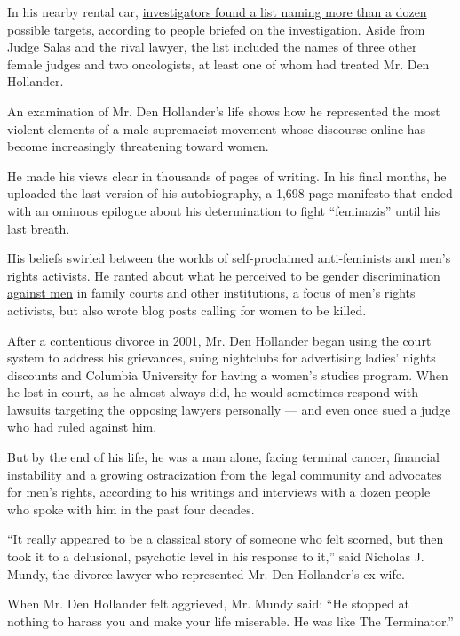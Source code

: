 In his nearby rental car,
\href{https://www.nytimes3xbfgragh.onion/2020/07/25/nyregion/roy-den-hollander-esther-salas-list.html}{investigators
found a list naming more than a dozen possible targets}, according to
people briefed on the investigation. Aside from Judge Salas and the
rival lawyer, the list included the names of three other female judges
and two oncologists, at least one of whom had treated Mr. Den Hollander.

An examination of Mr. Den Hollander's life shows how he represented the
most violent elements of a male supremacist movement whose discourse
online has become increasingly threatening toward women.

He made his views clear in thousands of pages of writing. In his final
months, he uploaded the last version of his autobiography, a 1,698-page
manifesto that ended with an ominous epilogue about his determination to
fight ``feminazis'' until his last breath.

His beliefs swirled between the worlds of self-proclaimed anti-feminists
and men's rights activists. He ranted about what he perceived to be
\href{https://www.nytimes3xbfgragh.onion/2018/07/13/style/mens-rights-movement.html}{gender
discrimination against men} in family courts and other institutions, a
focus of men's rights activists, but also wrote blog posts calling for
women to be killed.

After a contentious divorce in 2001, Mr. Den Hollander began using the
court system to address his grievances, suing nightclubs for advertising
ladies' nights discounts and Columbia University for having a women's
studies program. When he lost in court, as he almost always did, he
would sometimes respond with lawsuits targeting the opposing lawyers
personally --- and even once sued a judge who had ruled against him.

But by the end of his life, he was a man alone, facing terminal cancer,
financial instability and a growing ostracization from the legal
community and advocates for men's rights, according to his writings and
interviews with a dozen people who spoke with him in the past four
decades.

``It really appeared to be a classical story of someone who felt
scorned, but then took it to a delusional, psychotic level in his
response to it,'' said Nicholas J. Mundy, the divorce lawyer who
represented Mr. Den Hollander's ex-wife.

When Mr. Den Hollander felt aggrieved, Mr. Mundy said: ``He stopped at
nothing to harass you and make your life miserable. He was like The
Terminator.''


